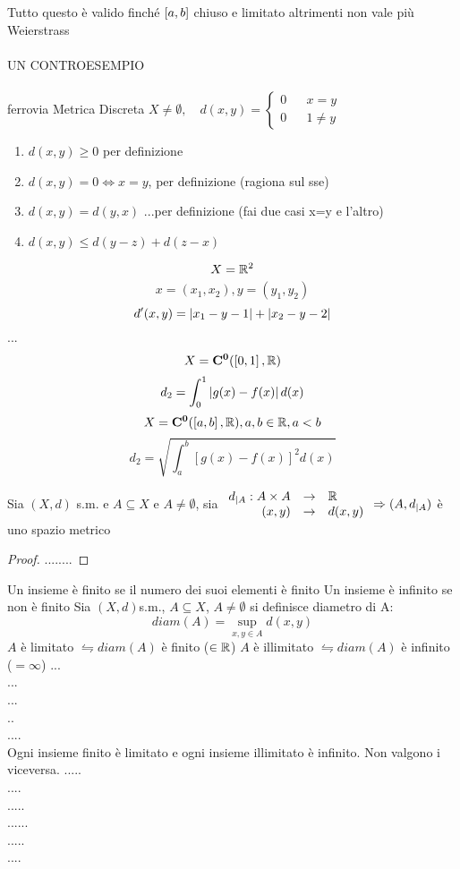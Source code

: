 \observation 
Tutto questo è valido finché $\left[a,b\right]$ chiuso e limitato altrimenti non vale più Weierstrass \\
\\
UN CONTROESEMPIO\\
\\
\example
ferrovia
\example
Metrica Discreta
$X\ne \emptyset,\quad d(x,y)= \left\{\begin{matrix}0&&x=y\\0&&1\ne y\end{matrix}\right.$
	\begin{enumerate}
		\item $d(x,y)\ge 0$ per definizione
		\item $d(x,y)=0\iff x=y$, per definizione (ragiona sul sse) 
		\item $d(x,y)=d(y,x)$ ...per definizione (fai due casi x=y e l'altro)
		\item $d(x,y)\le d(y-z)+d(z-x)$ 
	\end{enumerate}
\example
$$X=\mathbb{R}^2$$
$$x=(x_1,x_2), y=(y_1,y_2)$$
$$d'(x,y)=\left|x_1-y-1\right|+\left|x_2-y-2\right|$$
...\\

\example
\example
$$X=\mathbf{C^{0}}(\left[0,1\right],\mathbb{R})$$
$$d_2=\int_0^1\left|g(x)-f(x)\right|d(x)$$
\example
$$X=\mathbf{C^{0}}(\left[a,b\right],\mathbb{R}), a,b\in\mathbb{R}, a<b$$
$$d_2=\sqrt{\int_a^b\left[g(x)-f(x)\right]^2d(x)}$$

\proposition
Sia $(X,d)$ s.m. e $A\subseteq X$ e $A\ne \emptyset$, sia $\begin{array}{rcl} d_{|A} : A\times A & \to & \mathbb{R} \\ (x,y) & \to & d(x,y) \end{array} \Rightarrow (A,d_{|A})$ è uno spazio metrico
\begin{proof}
	........
\end{proof}

Un insieme è finito se il numero dei suoi elementi è finito
Un insieme è infinito se non è finito
Sia $(X,d)$s.m., $A\subseteq X$, $A\ne \emptyset$ si definisce diametro di A: $$diam(A)=\sup\limits_{x,y\in A}d(x,y)$$
$A$ è limitato $\leftrightharpoons diam(A)$ è finito ($\in\mathbb{R}$)
$A$ è illimitato $\leftrightharpoons diam(A)$ è infinito ($=\infty$)
\example
...\\
...\\
...\\
..\\
....\\
\observation
Ogni insieme finito è limitato e ogni insieme illimitato è infinito. Non valgono i viceversa.
\example 
.....\\
....\\
.....\\
......\\
.....\\
....\\

